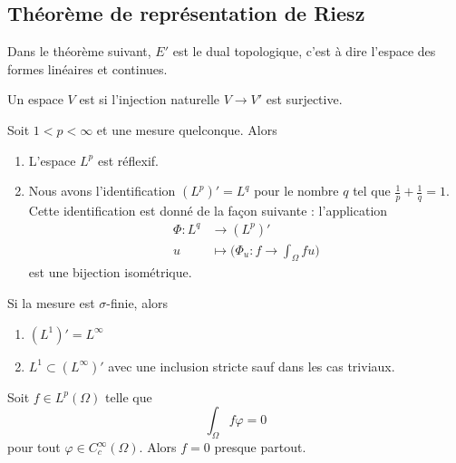 \subsection{Théorème de représentation de Riesz}

Dans le théorème suivant, \( E'\) est le dual topologique, c'est à dire l'espace des formes linéaires et continues.
\begin{definition}
    Un espace \( V\) est  si l'injection naturelle \( V\to V'\) est surjective.
\end{definition}

\begin{theorem} \label{ThoSCiPRpq}
    Soit \( 1<p<\infty\) et une mesure quelconque. Alors
    \begin{enumerate}
        \item
            L'espace \( L^p\) est réflexif.
        \item
            Nous avons l'identification \( (L^p)'=L^q\) pour le nombre \( q\) tel que \( \frac{1}{ p }+\frac{1}{ q }=1\). Cette identification est donné de la façon suivante : l'application
            \begin{equation}
                \begin{aligned}
                    \Phi\colon L^q&\to (L^p)' \\
                    u&\mapsto \Big( \Phi_u\colon f\to \int_{\Omega}fu \Big) 
                \end{aligned}
            \end{equation}
            est une bijection isométrique.
    \end{enumerate}
    Si la mesure est \( \sigma\)-finie, alors
    \begin{enumerate}
        \item
            \( (L^1)'=L^{\infty}\)
        \item
            \( L^1\subset (L^{\infty})' \) avec une inclusion stricte sauf dans les cas triviaux.
    \end{enumerate}
\end{theorem}

\begin{proposition} \label{PropUKLZZZh}
    Soit \( f\in L^p(\Omega)\) telle que
    \begin{equation}
        \int_{\Omega}f\varphi=0
    \end{equation}
    pour tout \( \varphi\in C^{\infty}_c(\Omega)\). Alors \( f=0\) presque partout.
\end{proposition}

